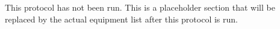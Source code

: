 This protocol has not been run.  This is a placeholder section that will be
replaced by the actual equipment list after this protocol is run.
